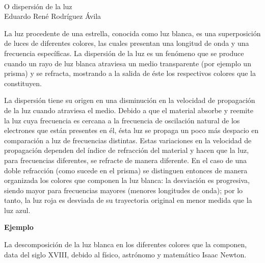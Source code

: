 \documentclass[12pt,letterpaper]{article}
\author{Tu nombre}
\begin{document}
	\begin{flushright}
		\\
        {\color{gray}O dispersión de la luz}\\
       Eduardo René Rodríguez Ávila
	\end{flushright}

La luz procedente de una estrella, conocida como luz blanca, es una superposición de luces de diferentes colores, las cuales presentan una longitud de onda y una frecuencia específicas. La dispersión de la luz es un fenómeno que se produce cuando un rayo de luz blanca atraviesa un medio transparente (por ejemplo un prisma) y se refracta, mostrando a la salida de éste los respectivos colores que la constituyen.

\begin{sloppypar}
La dispersión tiene su origen en una disminución en la velocidad de propagación de la luz cuando atraviesa el medio. Debido a que el material absorbe y reemite la luz cuya frecuencia es cercana a la frecuencia de oscilación natural de los electrones que están presentes en él, ésta luz se propaga un poco más despacio en comparación a luz de frecuencias distintas. Estas variaciones en la velocidad de propagación dependen del índice de refracción del material y hacen que la luz, para frecuencias diferentes, se refracte de manera diferente. En el caso de una doble refracción (como sucede en el prisma) se distinguen entonces de manera organizada los colores que componen la luz blanca: la desviación es progresiva, siendo mayor para frecuencias mayores (menores longitudes de onda); por lo tanto, la {\color{red}luz roja} es desviada de su trayectoria original en menor medida que la {\color{blue}luz azul}.
\end{sloppypar}

{\large \textbf{Ejemplo}}

\begin{sloppypar}
La descomposición de la luz blanca en los diferentes colores que la componen, data del siglo XVIII, debido al físico, astrónomo y matemático Isaac Newton.
\end{sloppypar}
\end{document}
